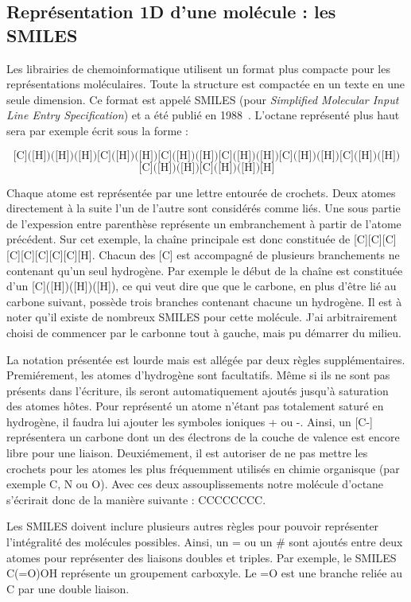 \subsection{Représentation 1D d'une molécule : les SMILES}

Les librairies de chemoinformatique utilisent un format plus compacte pour les représentations moléculaires.
Toute la structure est compactée en un texte en une seule dimension.
Ce format est appelé SMILES (pour \textit{Simplified Molecular Input Line Entry Specification}) et a été publié en 1988~\cite{weininger_smiles_1988}.
L'octane représenté plus haut sera par exemple écrit sous la forme :

\[\text{[C]([H])([H])([H])[C]([H])([H])[C]([H])([H])[C]([H])([H])[C]([H])([H])[C]([H])([H])}\]
\[\text{[C]([H])([H])[C]([H])([H])[H]}\]

Chaque atome est représentée par une lettre entourée de crochets.
Deux atomes directement à la suite l'un de l'autre sont considérés comme liés.
Une sous partie de l'expession entre parenthèse représente un embranchement à partir de l'atome précédent.
Sur cet exemple, la chaîne principale est donc constituée de [C][C][C][C][C][C][C][C][H].
Chacun des [C] est accompagné de plusieurs branchements ne contenant qu'un seul hydrogène.
Par exemple le début de la chaîne est constituée d'un [C]([H])([H])([H]), ce qui veut dire que que le carbone, en plus d'être lié au carbone suivant, possède trois branches contenant chacune un hydrogène.
Il est à noter qu'il existe de nombreux SMILES pour cette molécule.
J'ai arbitrairement choisi de commencer par le carbonne tout à gauche, mais pu démarrer du milieu.

La notation présentée est lourde mais est allégée par deux règles supplémentaires.
Premiérement, les atomes d'hydrogène sont facultatifs.
Même si ils ne sont pas présents dans l'écriture, ils seront automatiquement ajoutés jusqu'à saturation des atomes hôtes.
Pour représenté un atome n'étant pas totalement saturé en hydrogène, il faudra lui ajouter les symboles ioniques + ou -.
Ainsi, un [C-] représentera un carbone dont un des électrons de la couche de valence est encore libre pour une liaison.
Deuxiémement, il est autoriser de ne pas mettre les crochets pour les atomes les plus fréquemment utilisés en chimie organisque (par exemple C, N ou O).
Avec ces deux assouplissements notre molécule d'octane s'écrirait donc de la manière suivante : CCCCCCCC.

Les SMILES doivent inclure plusieurs autres règles pour pouvoir représenter l'intégralité des molécules possibles.
Ainsi, un = ou un \# sont ajoutés entre deux atomes pour représenter des liaisons doubles et triples.
Par exemple, le SMILES C(=O)OH représente un groupement carboxyle.
Le =O est une branche reliée au C par une double liaison.

